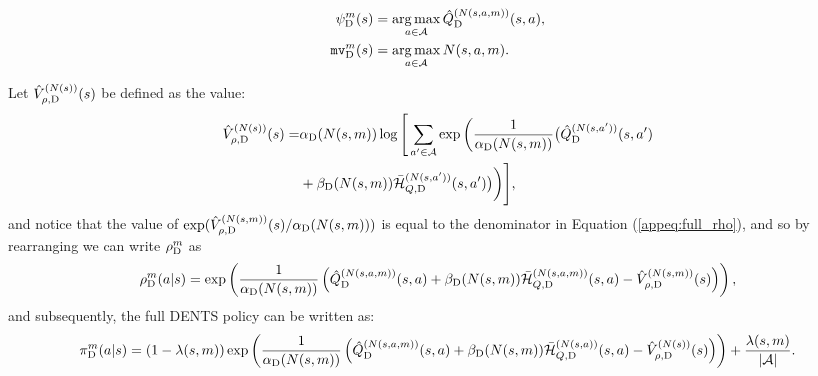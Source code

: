 
    \begin{align}
        {\psi^{m}_{{\textnormal{D}}}}(s) &= \operatorname*{arg\,max}_{a\in\mathcal{A}}{\hat{Q}^{(N(s,a,m))}_{{\textnormal{D}}}}(s,a), \\
        {\texttt{mv}^{m}_{{\textnormal{D}}}}(s) &= \operatorname*{arg\,max}_{a\in\mathcal{A}} N(s,a,m).
    \end{align}

     Let ${\hat{V}^{(N(s))}_{\rho,{\textnormal{D}}}}(s)$ be defined as the value:
    \begin{align}
        {\hat{V}^{(N(s))}_{\rho,{\textnormal{D}}}}(s) = &
            {\alpha_{{\textnormal{D}}}}(N(s,m)) \log \Bigg[ \sum_{a'\in\mathcal{A}} \exp\bigg(\frac{1}{{\alpha_{{\textnormal{D}}}}(N(s,m))}
                \big({\hat{Q}^{(N(s,a'))}_{{\textnormal{D}}}}(s,a') \nonumber \\
            &+ {\beta_{{\textnormal{D}}}}(N(s,m)){\bar{\mathcal{H}}^{(N(s,a'))}_{Q,{\textnormal{D}}}}(s,a') \big)\bigg)\Bigg], \label{appeq:v_rho}
    \end{align} 
    and notice that the value of $\exp({\hat{V}^{(N(s,m))}_{\rho,{\textnormal{D}}}}(s)/{\alpha_{{\textnormal{D}}}}(N(s,m)))$ is equal to the denominator in Equation (\ref{appeq:full_rho}), and so by rearranging we can write ${\rho^{m}_{{\textnormal{D}}}}$ as 
    \begin{align}
        {\rho^{m}_{{\textnormal{D}}}}(a|s) = 
            \exp\left(\frac{1}{{\alpha_{{\textnormal{D}}}}(N(s,m))}\left(
                {\hat{Q}^{(N(s,a,m))}_{{\textnormal{D}}}}(s,a) 
                + {\beta_{{\textnormal{D}}}}(N(s,m)){\bar{\mathcal{H}}^{(N(s,a,m))}_{Q,{\textnormal{D}}}}(s,a) 
                - {\hat{V}^{(N(s,m))}_{\rho,{\textnormal{D}}}}(s) \right)\right), \label{appeq:rho_concise}
    \end{align}
    and subsequently, the full DENTS policy can be written as:
    \begin{align}
        {\pi^{m}_{{\textnormal{D}}}}(a|s) = (1-\lambda(s,m))\exp\left(\frac{1}{{\alpha_{{\textnormal{D}}}}(N(s,m))}\left({\hat{Q}^{(N(s,a,m))}_{{\textnormal{D}}}}(s,a) + {\beta_{{\textnormal{D}}}}(N(s,m)){\bar{\mathcal{H}}^{(N(s,a))}_{Q,{\textnormal{D}}}}(s,a) - {\hat{V}^{(N(s))}_{\rho,{\textnormal{D}}}}(s) \right)\right) + \frac{\lambda(s,m)}{|\mathcal{A}|}. \label{appeq:dents_search_policy_exact} 
    \end{align}









